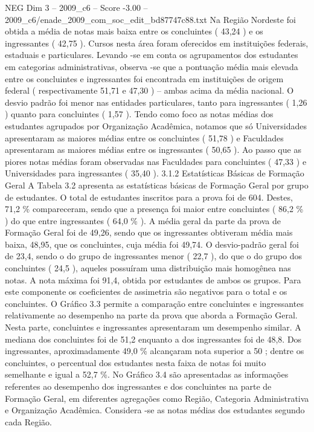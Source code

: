 \begin{textsample}{NEG Dim 3 – 2009\_c6 – Score -3.00 – 2009\_c6/enade\_2009\_com\_soc\_edit\_bd87747c88.txt}
Na Região Nordeste foi obtida a média de notas mais baixa entre os concluintes ( 43,24 ) e os ingressantes ( 42,75 ).
Cursos nesta área foram oferecidos em instituições federais, estaduais e particulares.
Levando -se em conta os agrupamentos dos estudantes em categorias administrativas, observa -se que a pontuação média mais elevada entre os concluintes e ingressantes foi encontrada em instituições de origem federal ( respectivamente 51,71 e 47,30 ) – ambas acima da média nacional.
O desvio padrão foi menor nas entidades particulares, tanto para ingressantes ( 1,26 ) quanto para concluintes ( 1,57 ).
Tendo como foco as notas médias dos estudantes agrupados por Organização Acadêmica, notamos que só Universidades apresentaram as maiores médias entre os concluintes ( 51,78 ) e Faculdades apresentaram as maiores médias entre os ingressantes ( 50,65 ).
Ao passo que as piores notas médias foram observadas nas Faculdades para concluintes ( 47,33 ) e Universidades para ingressantes ( 35,40 ). 3.1.2 Estatísticas Básicas de Formação Geral A Tabela 3.2 apresenta as estatísticas básicas de Formação Geral por grupo de estudantes.
O total de estudantes inscritos para a prova foi de 604.
Destes, 71,2 \% compareceram, sendo que a presença foi maior entre concluintes ( 86,2 \% ) do que entre ingressantes ( 64,0 \% ).
A média geral da parte da prova de Formação Geral foi de 49,26, sendo que os ingressantes obtiveram média mais baixa, 48,95, que os concluintes, cuja média foi 49,74.
O desvio-padrão geral foi de 23,4, sendo o do grupo de ingressantes menor ( 22,7 ), do que o do grupo dos concluintes ( 24,5 ), aqueles possuíram uma distribuição mais homogênea nas notas.
A nota máxima foi 91,4, obtida por estudantes de ambos os grupos.
Para este componente os coeficientes de assimetria são negativos para o total e os concluintes.
O Gráfico 3.3 permite a comparação entre concluintes e ingressantes relativamente ao desempenho na parte da prova que aborda a Formação Geral.
Nesta parte, concluintes e ingressantes apresentaram um desempenho similar.
A mediana dos concluintes foi de 51,2 enquanto a dos ingressantes foi de 48,8.
Dos ingressantes, aproximadamente 49,0 \% alcançaram nota superior a 50 ; dentre os concluintes, o percentual dos estudantes nesta faixa de notas foi muito semelhante e igual a 52,7 \%.
No Gráfico 3.4 são apresentadas as informações referentes ao desempenho dos ingressantes e dos concluintes na parte de Formação Geral, em diferentes agregações como Região, Categoria Administrativa e Organização Acadêmica.
Considera -se as notas médias dos estudantes segundo cada Região.

\end{textsample}
